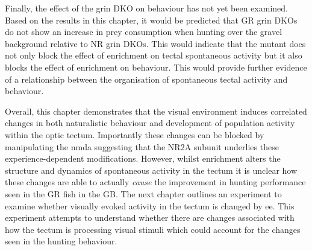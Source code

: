Finally, the effect of the \gls{grin} DKO on behaviour has not yet been examined. Based on the results in this chapter, it would be predicted that GR \gls{grin} DKOs do not show an increase in prey consumption when hunting over the gravel background relative to NR \gls{grin} DKOs. This would indicate that the mutant does not only block the effect of enrichment on tectal spontaneous activity but it also blocks the effect of enrichment on behaviour. This would provide further evidence of a relationship between the organisation of spontaneous tectal activity and behaviour. 

Overall, this chapter demonstrates that the visual environment induces correlated changes in both naturalistic behaviour and development of population activity within the optic tectum. Importantly these changes can be blocked by manipulating the \gls{nmda} suggesting that the NR2A subunit underlies these experience-dependent modifications. However, whilst enrichment alters the structure and dynamics of spontaneous activity in the tectum it is unclear how these changes are able to actually \textit{cause} the improvement in hunting performance seen in the GR fish in the GB. The next chapter outlines an experiment to examine whether visually evoked activity in the tectum is changed by \gls{ee}. This experiment attempts to understand whether there are changes associated with how the tectum is processing visual stimuli which could account for the changes seen in the hunting behaviour.













      
      


